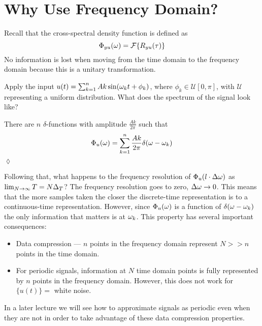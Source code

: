 \mainmatter%
\setcounter{page}{1}

\lectureseries[\course]{\course}

\date{October 13, 2009}

\setaddress%

\setcounter{lecture}{5}
\setcounter{chapter}{5}


\section{Why Use Frequency Domain?}
Recall that the cross-spectral density function is defined as
$$\Phi_{yu}(\omega) = \mathcal{F}\{R_{yu}(\tau)\}$$
No information is lost when moving from the time domain to the frequency domain because this is a unitary transformation.

\begin{example}
Apply the input $u(t) = \sum_{k=1}^n Ak\sin(\omega_k t+\phi_k)$, where $\phi_k\in\mathcal{U}[0,\pi]$, with $\mathcal{U}$ representing a uniform distribution.
What does the spectrum of the signal look like?

There are $n$ $\delta$-functions with amplitude $\frac{Ak}{2\pi}$ such that
$$\Phi_u(\omega) = \sum_{k=1}^n \frac{Ak}{2\pi}\delta(\omega-\omega_k)$$
$\lozenge$
\end{example}

Following that, what happens to the frequency resolution of $\Phi_u(l\cdot\Delta\omega)$ as $\lim_{N\to\infty}T = N\Delta_T$? The frequency resolution goes to zero, $\Delta\omega\to 0$.
This means that the more samples taken the closer the discrete-time representation is to a continuous-time representation.
However, since $\Phi_u(\omega)$ is a function of $\delta(\omega-\omega_k)$ the only information that matters is at $\omega_k$.
This property has several important consequences:
\begin{itemize}
\item Data compression --- $n$ points in the frequency domain represent $N>>n$ points in the time domain.
\item For periodic signals, information at $N$ time domain points is fully represented by $n$ points in the frequency domain.
However, this does not work for $\{u(t)\} =$ white noise.
\end{itemize}
In a later lecture we will see how to approximate signals as periodic even when they are not in order to take advantage of these data compression properties.

